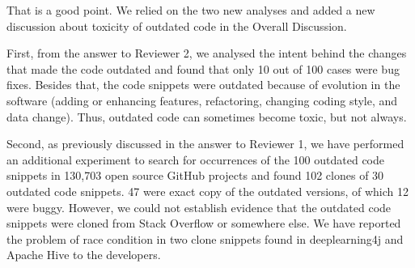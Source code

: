 \documentclass[a4paper,twoside,10pt]{reviewresponse}
\begin{document}

That is a good point. We relied on the two new analyses and added a new discussion about toxicity of outdated code in the Overall Discussion. 

First, from the answer to Reviewer 2, we analysed the intent behind the changes that made the code outdated and found that only 10 out of 100 cases were bug fixes. Besides that, the code snippets were outdated because of evolution in the software (adding or enhancing features, refactoring, changing coding style, and data change). Thus, outdated code can sometimes become toxic, but not always.

Second, as previously discussed in the answer to Reviewer 1, we have performed an additional experiment to search for occurrences of the 100 outdated code snippets in 130,703 open source GitHub projects and found 102 clones of 30 outdated code snippets. 47 were exact copy of the outdated versions, of which 12 were buggy. However, we could not establish evidence that the outdated code snippets were cloned from Stack Overflow or somewhere else. We have reported the problem of race condition in two clone snippets found in deeplearning4j and Apache Hive to the developers.
\end{document}
